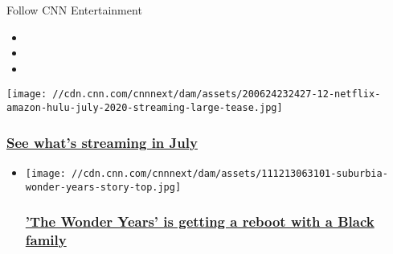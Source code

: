 Follow CNN Entertainment

\begin{itemize}
\item
\item
\item
\end{itemize}

\href{/2020/06/30/entertainment/netflix-hulu-amazon-july/index.html}{}

\texttt{[image: //cdn.cnn.com/cnnnext/dam/assets/200624232427-12-netflix-amazon-hulu-july-2020-streaming-large-tease.jpg]}

\hypertarget{see-whats-streaming-in-july}{%
\subsubsection{\texorpdfstring{\href{/2020/06/30/entertainment/netflix-hulu-amazon-july/index.html}{See
what's streaming in
July}}{See what's streaming in July}}\label{see-whats-streaming-in-july}}

\begin{itemize}
\item
  \href{/2020/07/09/entertainment/wonder-years-black-reboot/index.html}{}

  \texttt{[image: //cdn.cnn.com/cnnnext/dam/assets/111213063101-suburbia-wonder-years-story-top.jpg]}

  \hypertarget{the-wonder-years-is-getting-a-reboot-with-a-black-family}{%
  \subsubsection{\texorpdfstring{\href{/2020/07/09/entertainment/wonder-years-black-reboot/index.html}{'The
  Wonder Years' is getting a reboot with a Black
  family}}{'The Wonder Years' is getting a reboot with a Black family}}\label{the-wonder-years-is-getting-a-reboot-with-a-black-family}}
\end{itemize}

